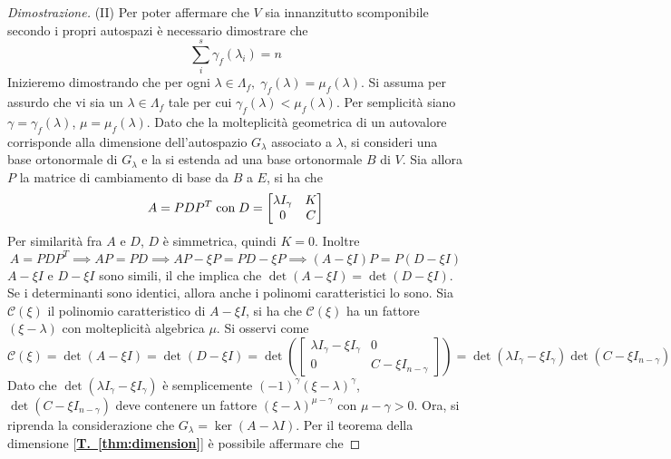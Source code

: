 \documentclass{article}
\begin{document}
\begin{proof}[Dimostrazione]
        \vspace{10pt}
        (II) Per poter affermare che $V$ sia innanzitutto scomponibile secondo i propri autospazi è necessario dimostrare che 
        \[
            \sum_{i}^{s} \gamma_f(\lambda_i) = n
        \]
        Inizieremo dimostrando che per ogni $\lambda \in \Lambda_{f}, \; \gamma_{f}(\lambda) = \mu_{f}(\lambda)$. Si assuma per assurdo che vi sia un $\lambda \in \Lambda_{f}$ tale per cui $\gamma_{f}(\lambda) < \mu_{f}(\lambda)$. Per semplicità siano $\gamma = \gamma_{f}(\lambda)$, $\mu = \mu_{f}(\lambda)$. Dato che la molteplicità geometrica di un autovalore corrisponde alla 
        dimensione dell'autospazio $G_{\lambda}$ associato a $\lambda$, si consideri una base ortonormale di $G_{\lambda}$ e la si estenda ad una base ortonormale $B$ di $V$. Sia allora $P$ la matrice di cambiamento di base da $B$ a $E$, si ha che
        \[
            A = PDP^{T} \; \textnormal{con} \; D = \begin{bmatrix}
                \lambda I_{\gamma} & K \\
                0 & C
            \end{bmatrix} 
        \]
        Per similarità fra $A$ e $D$, $D$ è simmetrica, quindi $K = 0$. Inoltre
        \[
            A = PDP^{T} \implies AP = PD \implies AP - \xi P = PD - \xi P \implies (A - \xi I) P = P (D - \xi I)
        \]
        $A - \xi I$ e $D - \xi I$ sono simili, il che implica che $\det(A - \xi I) = \det(D - \xi I)$. Se i determinanti sono identici, allora anche i polinomi caratteristici lo sono. Sia $\mathcal{C}(\xi)$ il polinomio caratteristico di $A - \xi I$, si ha che 
        $\mathcal{C}(\xi)$ ha un fattore $(\xi - \lambda)$ con molteplicità algebrica $\mu$. Si osservi come
        \[
            \mathcal{C}(\xi) = \det(A - \xi I) = \det(D - \xi I) = \det\left(\begin{bmatrix}
                \lambda I_{\gamma} - \xi I_{\gamma} & 0 \\
                0 & C - \xi I_{n - \gamma}
            \end{bmatrix}\right) = 
            \det(\lambda I_{\gamma} - \xi I_{\gamma})\det(C - \xi I_{n - \gamma})
        \]
        Dato che $\det(\lambda I_{\gamma} - \xi I_{\gamma})$ è semplicemente $(-1)^{\gamma}(\xi - \lambda)^{\gamma}$, $\det(C - \xi I_{n - \gamma})$ deve contenere un fattore $(\xi - \lambda)^{\mu - \gamma}$ con $\mu - \gamma > 0$.
        Ora, si riprenda la considerazione che $G_{\lambda} = \ker(A - \lambda I)$. Per il teorema della dimensione [{\bfseries \hyperref[thm:dimension]{T.~\ref{thm:dimension}}}] è possibile affermare che 

\end{proof}
\end{document}
